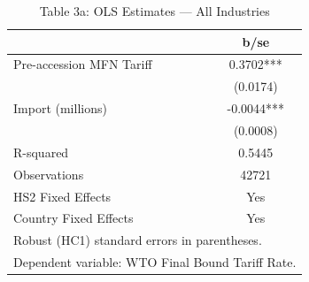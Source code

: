 \begin{table}[htbp]\centering
\def\sym#1{\ifmmode^{#1}\else\(^{#1}\)\fi}
\caption{Table 3a: OLS Estimates --- All Industries}
\begin{tabular}{l*{1}{c}}
\toprule
            &        b/se   \\
\midrule
Pre-accession MFN Tariff&      0.3702***\\
            &    (0.0174)   \\
Import (millions)&     -0.0044***\\
            &    (0.0008)   \\
\midrule
R-squared   &      0.5445   \\
Observations&       42721   \\
HS2 Fixed Effects&         Yes   \\
Country Fixed Effects&         Yes   \\
\bottomrule
\multicolumn{2}{l}{\footnotesize Robust (HC1) standard errors in parentheses.}\\
\multicolumn{2}{l}{\footnotesize Dependent variable: WTO Final Bound Tariff Rate.}\\
\end{tabular}
\end{table}
